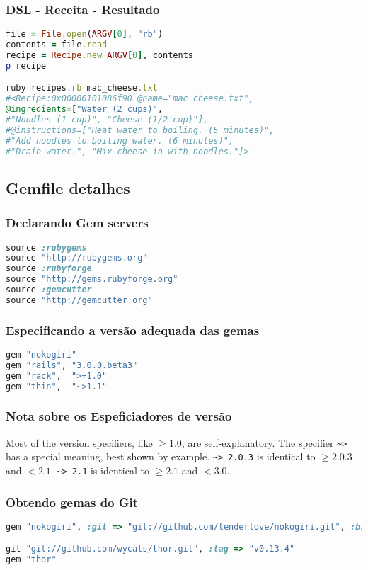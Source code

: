 \documentclass[serif,mathserif]{article}
\begin{document}
\subsubsection{DSL - Receita - Resultado}
\begin{lstlisting}[language=ruby]
file = File.open(ARGV[0], "rb")
contents = file.read
recipe = Recipe.new ARGV[0], contents
p recipe

ruby recipes.rb mac_cheese.txt 
#<Recipe:0x00000101086f90 @name="mac_cheese.txt", 
@ingredients=["Water (2 cups)", 
#"Noodles (1 cup)", "Cheese (1/2 cup)"], 
#@instructions=["Heat water to boiling. (5 minutes)", 
#"Add noodles to boiling water. (6 minutes)", 
#"Drain water.", "Mix cheese in with noodles."]>
\end{lstlisting}


\subsection{Gemfile detalhes}

\subsubsection{Declarando Gem servers}
\begin{lstlisting}[language=ruby]
source :rubygems
source "http://rubygems.org"
source :rubyforge
source "http://gems.rubyforge.org"
source :gemcutter
source "http://gemcutter.org"
\end{lstlisting}

\subsubsection{Especificando a versão adequada das gemas}
\begin{lstlisting}[language=ruby]
gem "nokogiri"
gem "rails", "3.0.0.beta3"
gem "rack",  ">=1.0"
gem "thin",  "~>1.1"
\end{lstlisting}

\subsubsection{Nota sobre os Espeficiadores de versão}
Most of the version specifiers, like $\geq 1.0$, are self-explanatory. The specifier \verb|~>| has a special meaning, best shown by example. \verb|~> 2.0.3| is identical to $\geq 2.0.3$ and $<  2.1$. \verb|~> 2.1| is identical to $ \geq 2.1$ and $< 3.0$.

\subsubsection{Obtendo gemas do Git}
\begin{lstlisting}[language=ruby]
gem "nokogiri", :git => "git://github.com/tenderlove/nokogiri.git", :branch => "1.4"

git "git://github.com/wycats/thor.git", :tag => "v0.13.4"
gem "thor"
\end{lstlisting}
\end{document}
